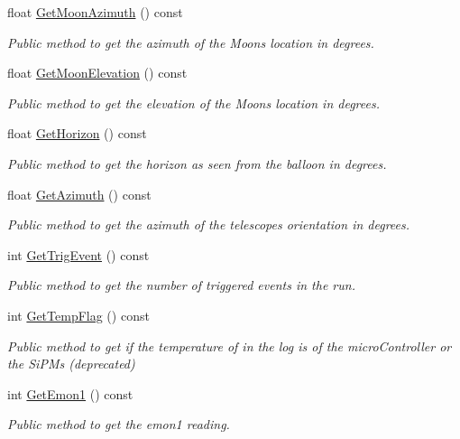 \begin{DoxyCompactItemize}
float \hyperlink{classIEvent_a0e07e2093f44fe582dbf0ac2edc2be1e}{Get\+Moon\+Azimuth} () const
\begin{DoxyCompactList}\small\item\em Public method to get the azimuth of the Moon\textquotesingle{}s location in degrees. \end{DoxyCompactList}\item 
float \hyperlink{classIEvent_a7d2d4ae598274c81b51392cff18194c8}{Get\+Moon\+Elevation} () const
\begin{DoxyCompactList}\small\item\em Public method to get the elevation of the Moon\textquotesingle{}s location in degrees. \end{DoxyCompactList}\item 
float \hyperlink{classIEvent_a7ba773316eefbd7190f5b1ac16206b63}{Get\+Horizon} () const
\begin{DoxyCompactList}\small\item\em Public method to get the horizon as seen from the balloon in degrees. \end{DoxyCompactList}\item 
float \hyperlink{classIEvent_a8ea892cd0207dd1fa3ff4a550681f323}{Get\+Azimuth} () const
\begin{DoxyCompactList}\small\item\em Public method to get the azimuth of the telescope\textquotesingle{}s orientation in degrees. \end{DoxyCompactList}\item 
int \hyperlink{classIEvent_a773e95dbb87039b7c90f22504a2c20c4}{Get\+Trig\+Event} () const
\begin{DoxyCompactList}\small\item\em Public method to get the number of triggered events in the run. \end{DoxyCompactList}\item 
int \hyperlink{classIEvent_ae951ab751628dbad6aa264d3e9bc49ce}{Get\+Temp\+Flag} () const
\begin{DoxyCompactList}\small\item\em Public method to get if the temperature of in the log is of the micro\+Controller or the Si\+P\+Ms (deprecated) \end{DoxyCompactList}\item 
int \hyperlink{classIEvent_a4d95eb0bd935bc7089bdf13be6cfb35d}{Get\+Emon1} () const
\begin{DoxyCompactList}\small\item\em Public method to get the emon1 reading. \end{DoxyCompactList}\item 

\end{DoxyCompactItemize}
